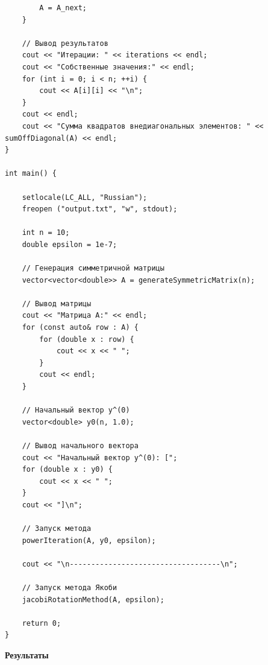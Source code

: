 \documentclass[a4paper, 12pt]{report}
\begin{document}
\begin{verbatim}
        A = A_next;
    }

    // Вывод результатов
    cout << "Итерации: " << iterations << endl;
    cout << "Собственные значения:" << endl;
    for (int i = 0; i < n; ++i) {
        cout << A[i][i] << "\n";
    }
    cout << endl;
    cout << "Сумма квадратов внедиагональных элементов: " << sumOffDiagonal(A) << endl;
}

int main() {

    setlocale(LC_ALL, "Russian");
    freopen ("output.txt", "w", stdout);

    int n = 10;
    double epsilon = 1e-7;

    // Генерация симметричной матрицы
    vector<vector<double>> A = generateSymmetricMatrix(n);

    // Вывод матрицы
    cout << "Матрица A:" << endl;
    for (const auto& row : A) {
        for (double x : row) {
            cout << x << " ";
        }
        cout << endl;
    }

    // Начальный вектор y^(0)
    vector<double> y0(n, 1.0);

    // Вывод начального вектора
    cout << "Начальный вектор y^(0): [";
    for (double x : y0) {
        cout << x << " ";
    }
    cout << "]\n";

    // Запуск метода
    powerIteration(A, y0, epsilon);

    cout << "\n-----------------------------------\n";

    // Запуск метода Якоби
    jacobiRotationMethod(A, epsilon);

    return 0;
}

   \end{verbatim}
   \newpage
   \textbf{\Huge{Результаты}}\\\\
\end{document}
